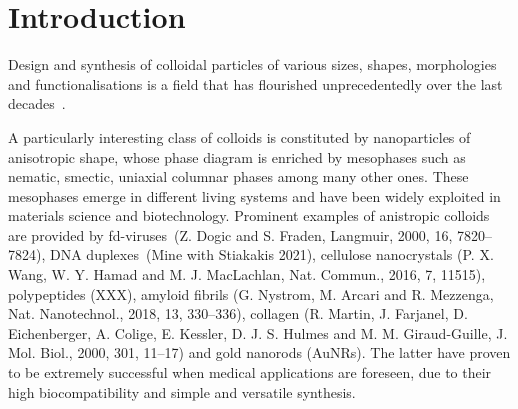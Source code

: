 \documentclass[journal=jacsat,manuscript=article]{achemso}
\begin{document}
\section{Introduction}



Design and synthesis of colloidal particles of various sizes, shapes, morphologies and functionalisations is a field that has flourished unprecedentedly over the last decades~\cite{Hueckel2021, Sacanna2013, Manoharan2015, Glotzer2007}. 


A particularly interesting class of colloids is constituted by nanoparticles of anisotropic shape, whose 
phase diagram is enriched by mesophases such as nematic, smectic, uniaxial columnar phases among many other ones.
These mesophases emerge in different living systems and have been widely exploited in materials science and 
biotechnology.  Prominent examples of anistropic colloids are provided by fd-viruses~(Z. Dogic and S. Fraden,
Langmuir, 2000, 16, 7820–7824), DNA duplexes~(Mine with Stiakakis 2021), cellulose nanocrystals (P. X. Wang, W. Y.
Hamad and M. J. MacLachlan, Nat. Commun., 2016, 7, 11515), polypeptides (XXX), amyloid fibrils (G. Nystrom, M. Arcari
 and R. Mezzenga, Nat. Nanotechnol., 2018, 13, 330–336), collagen (R. Martin, J. Farjanel, D. Eichenberger, A.
Colige, E. Kessler, D. J. S. Hulmes and M. M. Giraud-Guille, J. Mol. Biol., 2000, 301, 11–17) and gold nanorods 
(AuNRs). The latter have proven to be extremely successful when 
medical applications are foreseen, due to their high  biocompatibility and simple 
and versatile synthesis. 
\end{document}
